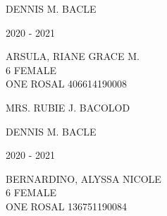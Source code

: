 \documentclass{article}
\begin{document}
{{\begin{multicols}{2}
\begin{flushright}
\end{flushright}  
\vspace*{1.5mm}
\hspace*{3em} DENNIS M. BACLE
\end{multicols} 
\newpage
\begin{multicols}{2}
\phantom{u}
\columnbreak
\vspace*{-3mm}
\begin{center}
\phantom{school year:} \hspace*{6em} 2020 - 2021 
\end{center} 
\vspace{4mm} 
\phantom{Name:} \hspace*{5em} ARSULA, RIANE GRACE M. \\[2.5mm] %
\phantom{Age} \hspace*{8em} 6  \phantom{Sex} \hspace*{12em} FEMALE \\[2.5mm] %
\phantom{Grade} \hspace*{3em} ONE \phantom{Section} \hspace*{4em} ROSAL \phantom{LRN} \hspace*{4em} 406614190008 \\
\vspace*{25mm}
\begin{flushright}
MRS. RUBIE J. BACOLOD \hspace*{-1.5em}
\end{flushright}  
\vspace*{1.5mm}
\hspace*{3em} DENNIS M. BACLE
\end{multicols} 
\newpage
\begin{multicols}{2}
\phantom{u}
\columnbreak
\vspace*{-3mm}
\begin{center}
\phantom{school year:} \hspace*{6em} 2020 - 2021 
\end{center} 
\vspace{4mm} 
\phantom{Name:} \hspace*{5em} BERNARDINO, ALYSSA NICOLE \\[2.5mm] %
\phantom{Age} \hspace*{8em} 6  \phantom{Sex} \hspace*{12em} FEMALE \\[2.5mm] %
\phantom{Grade} \hspace*{3em} ONE \phantom{Section} \hspace*{4em} ROSAL \phantom{LRN} \hspace*{4em} 136751190084 \\

\end{multicols}}}
\end{document}
